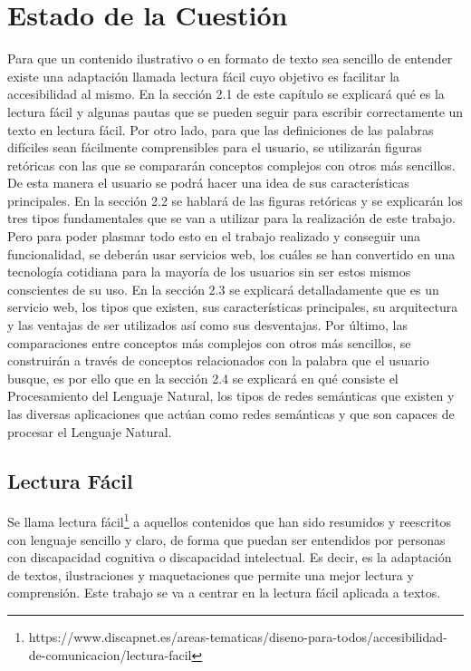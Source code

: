 \chapter{Estado de la Cuestión}
\label{cap:estadoDeLaCuestion}


Para que un contenido ilustrativo o en formato de texto sea sencillo de entender existe una adaptación llamada lectura fácil cuyo objetivo es facilitar la accesibilidad al mismo. En la sección 2.1 de este capítulo se explicará qué es la lectura fácil y algunas pautas que se pueden seguir para escribir correctamente un texto en lectura fácil. Por otro lado, para que las definiciones de las palabras difíciles sean fácilmente comprensibles para el usuario, se utilizarán figuras retóricas con las que se compararán conceptos complejos con otros más sencillos. De esta manera el usuario se podrá hacer una idea de sus características principales. En la sección 2.2 se hablará de las figuras retóricas y se explicarán los tres tipos fundamentales que se van a utilizar para la realización de este trabajo. 
Pero para poder plasmar todo esto en el trabajo realizado y conseguir una funcionalidad, se deberán usar servicios web, los cuáles se han convertido en una tecnología cotidiana para la mayoría de los usuarios sin ser estos mismos conscientes de su uso. En la sección 2.3 se explicará detalladamente que es un servicio web, los tipos que existen, sus características principales, su arquitectura y las ventajas de ser utilizados así como sus desventajas. Por último, las comparaciones entre conceptos más complejos con otros más sencillos, se construirán a través de conceptos relacionados con la palabra que el usuario busque, es por ello que en la sección 2.4 se explicará en qué consiste el Procesamiento del Lenguaje Natural, los tipos de redes semánticas que existen y las diversas aplicaciones que actúan como redes semánticas y que son capaces de procesar el Lenguaje Natural.

\section{Lectura Fácil}
\label{cap:sec:lecturafacil}

Se llama lectura fácil\footnote{https://www.discapnet.es/areas-tematicas/diseno-para-todos/accesibilidad-de-comunicacion/lectura-facil} a aquellos contenidos que han sido resumidos y reescritos con lenguaje sencillo y claro, de forma que puedan ser entendidos por personas con discapacidad cognitiva o discapacidad intelectual. Es decir, es la adaptación de textos, ilustraciones y maquetaciones que permite una mejor lectura y comprensión.
Este trabajo se va a centrar en la lectura fácil aplicada a textos.

